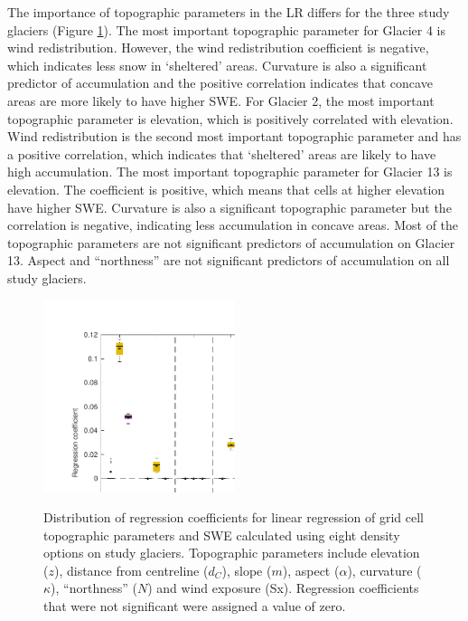 \documentclass[review,oneside, letterpaper]{igs}
\begin{document}
The importance of topographic parameters in the LR differs for the three study glaciers (Figure \ref{fig:BetaCoeffs}). The most important topographic parameter for Glacier 4 is wind redistribution. However, the wind redistribution coefficient is negative, which indicates less snow in `sheltered' areas. Curvature is also a significant predictor of accumulation and the positive correlation indicates that concave areas are more likely to have higher SWE. For Glacier 2, the most important topographic parameter is elevation, which is positively correlated with elevation. Wind redistribution is the second most important topographic parameter and has a positive correlation, which indicates that `sheltered' areas are likely to have high accumulation. The most important topographic parameter for Glacier 13 is elevation. The coefficient is positive, which means that cells at higher elevation have higher SWE. Curvature is also a significant topographic parameter but the correlation is negative, indicating less accumulation in concave areas. Most of the topographic parameters are not significant predictors of accumulation on Glacier 13. Aspect and ``northness'' are not significant predictors of accumulation on all study glaciers.

\begin{figure}
	\centering
	\includegraphics[width =0.5\textwidth]{BetaCoeffs.pdf}\\
	\caption{Distribution of regression coefficients for linear regression of grid cell topographic parameters and SWE calculated using eight density options on study glaciers. Topographic parameters include elevation ($z$), distance from centreline ($d_C$), slope ($m$), aspect ($\alpha$), curvature ($\kappa$), ``northness'' ($N$) and wind exposure (Sx). Regression coefficients that were not significant were assigned a value of zero.}
	\label{fig:BetaCoeffs}
\end{figure}
\end{document}
